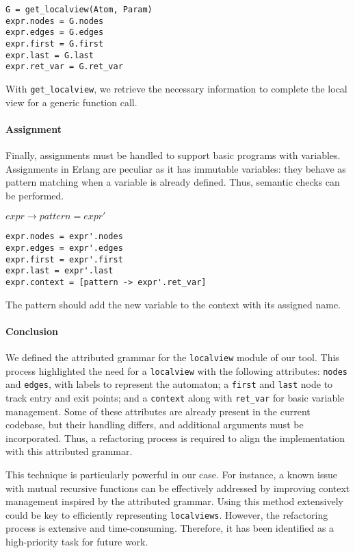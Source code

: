 \begin{verbatim}
G = get_localview(Atom, Param)
expr.nodes = G.nodes
expr.edges = G.edges
expr.first = G.first
expr.last = G.last
expr.ret_var = G.ret_var 
\end{verbatim}

With \texttt{get\_localview}, we retrieve the necessary information  
to complete the local view for a generic function call.  

\paragraph{Assignment}  
Finally, assignments must be handled to support basic programs  
with variables. Assignments in Erlang are peculiar as it has
immutable variables: they behave  
as pattern matching when a variable is already defined.
Thus, semantic checks can be performed.  

\bigskip

\noindent $expr \to pattern = expr'$

\begin{verbatim}
expr.nodes = expr'.nodes
expr.edges = expr'.edges
expr.first = expr'.first
expr.last = expr'.last
expr.context = [pattern -> expr'.ret_var]
\end{verbatim}

The pattern should add the new variable to the context  
with its assigned name.  

\paragraph{Conclusion}
We defined the attributed grammar for the \texttt{localview} module of our tool.  
This process highlighted the need for a \texttt{localview} with the following  
attributes: \texttt{nodes} and \texttt{edges}, with labels to represent the  
automaton; a \texttt{first} and \texttt{last} node to track entry and exit  
points; and a \texttt{context} along with \texttt{ret\_var} for basic  
variable management.
Some of these attributes are already present in the current codebase,  
but their handling differs, and additional arguments must be incorporated.  
Thus, a refactoring process is required to align the implementation with  
this attributed grammar.

This technique is particularly powerful in our case. 
For instance, a known issue with  
mutual recursive functions can be effectively addressed by improving  
context management inspired by the attributed grammar.
Using this method extensively could be key to  
efficiently representing \texttt{localviews}. 
However, the refactoring process is extensive and time-consuming.  
Therefore, it has been identified as a high-priority task for future work.  


